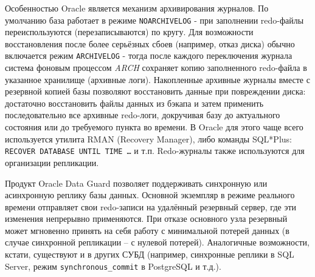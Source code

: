  Особенностью Oracle является механизм архивирования журналов. По умолчанию база работает в режиме \texttt{NOARCHIVELOG} - при заполнении redo-файлы переиспользуются (перезаписываются) по кругу. Для возможности восстановления после более серьёзных сбоев (например, отказ диска) обычно включается режим \texttt{ARCHIVELOG} - тогда после каждого переключения журнала система фоновым процессом \textit{ARCH} сохраняет копию заполненного redo-файла в указанное хранилище (архивные логи). Накопленные архивные журналы вместе с резервной копией базы позволяют восстановить данные при повреждении диска: достаточно восстановить файлы данных из бэкапа и затем применить последовательно все архивные redo-логи, докручивая базу до актуального состояния или до требуемого пункта во времени. В Oracle для этого чаще всего используется утилита RMAN (Recovery Manager), либо команды SQL*Plus: \texttt{RECOVER DATABASE UNTIL TIME \ldots} и т.п. Redo-журналы также используются для организации репликации. 
 
 Продукт Oracle Data Guard позволяет поддерживать синхронную или асинхронную реплику базы данных. Основной экземпляр в режиме реального времени отправляет свои redo-записи на удалённый резервный сервер, где эти изменения непрерывно применяются. При отказе основного узла резервный может мгновенно принять на себя работу с минимальной потерей данных (в случае синхронной репликации – с нулевой потерей). Аналогичные возможности, кстати, существуют и в других СУБД (например, синхронные реплики в SQL Server, режим \texttt{synchronous\_commit} в PostgreSQL и т.д.).
 
